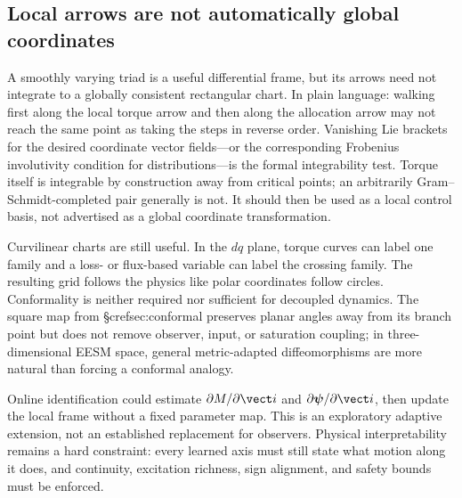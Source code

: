 

\subsection{Local arrows are not automatically global coordinates}

A smoothly varying triad is a useful differential frame, but its arrows need
not integrate to a globally consistent rectangular chart. In plain language:
walking first along the local torque arrow and then along the allocation arrow
may not reach the same point as taking the steps in reverse order. Vanishing
Lie brackets for the desired coordinate vector fields---or the corresponding
Frobenius involutivity condition for distributions---is the formal
integrability test. Torque itself is integrable by construction away from
critical points; an arbitrarily Gram--Schmidt-completed pair generally is not.
It should then be used as a local control basis, not advertised as a global
coordinate transformation.

Curvilinear charts are still useful. In the \(dq\) plane, torque curves can
label one family and a loss- or flux-based variable can label the crossing
family. The resulting grid follows the physics like polar coordinates follow
circles. Conformality is neither required nor sufficient for decoupled
dynamics. The square map from §cref{sec:conformal} preserves planar angles
away from its branch point but does not remove observer, input, or saturation
coupling; in three-dimensional EESM space, general metric-adapted
diffeomorphisms are more natural than forcing a conformal analogy.

Online identification could estimate
\(\partial M/\partial\vect i\) and
\(\partial\boldsymbol\psi/\partial\vect i\), then update the local frame
without a fixed parameter map. This is an exploratory adaptive extension, not
an established replacement for observers. Physical interpretability remains
a hard constraint: every learned axis must still state what motion along it
does, and continuity, excitation richness, sign alignment, and safety bounds
must be enforced.
